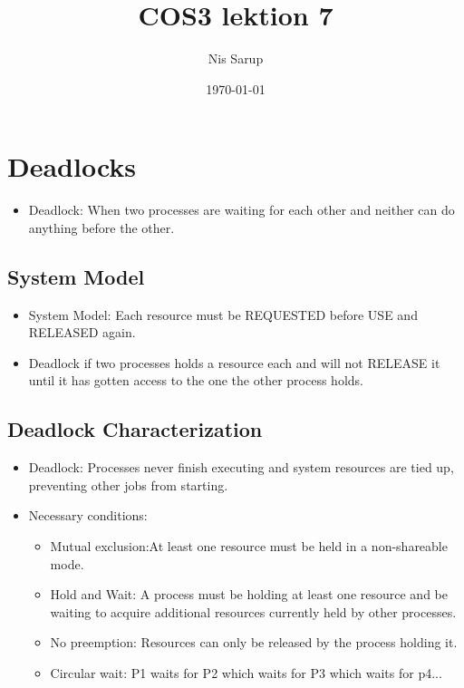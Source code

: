\documentclass[a4wide,10pt]{article}
\begin{document}
\title{COS3 lektion 7}
\author{Nis Sarup}
\date{\today}
\maketitle


\addtocounter{section}{6}
\section{Deadlocks} %
\label{sec:deadlocks}
\begin{itemize}
	\item Deadlock: When two processes are waiting for each other and neither can do anything before the other.
\end{itemize}
\subsection{System Model} %
\label{sub:system_model}
\begin{itemize}
	\item System Model: Each resource must be REQUESTED before USE and RELEASED again.
	\item Deadlock if two processes holds a resource each and will not RELEASE it until it has gotten access to the one the other process holds.
\end{itemize}

\subsection{Deadlock Characterization} %
\label{sub:deadlock_characterization}
\begin{itemize}
	\item Deadlock: Processes never finish executing and system resources are tied up, preventing other jobs from starting.
	\item Necessary conditions:
	\begin{itemize}
		\item Mutual exclusion:At least one resource must be held in a non-shareable mode.
		\item Hold and Wait: A process must be holding at least one resource and be waiting to acquire additional resources currently held by other processes.
		\item No preemption: Resources can only be released by the process holding it.
		\item Circular wait: P1 waits for P2 which waits for P3 which waits for p4... 
	\end{itemize}
\end{itemize}
\end{document}
